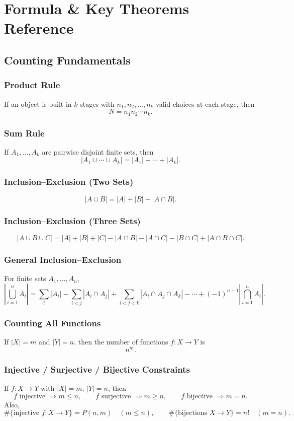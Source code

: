\documentclass[12pt]{article}
\begin{document}
\section{Formula \& Key Theorems Reference}

\subsection{Counting Fundamentals}

\subsubsection{Product Rule}
If an object is built in \(k\) stages with \(n_1,n_2,\dots,n_k\) valid choices at each stage, then
\[
N=n_1n_2\cdots n_k.
\]

\subsubsection{Sum Rule}
If \(A_1,\dots,A_k\) are pairwise disjoint finite sets, then
\[
\left|A_1\cup\cdots\cup A_k\right|
=
|A_1|+\cdots+|A_k|.
\]

\subsubsection{Inclusion--Exclusion (Two Sets)}
\[
|A\cup B|=|A|+|B|-|A\cap B|.
\]

\subsubsection{Inclusion--Exclusion (Three Sets)}
\[
|A\cup B\cup C|
=
|A|+|B|+|C|
-|A\cap B|-|A\cap C|-|B\cap C|
+|A\cap B\cap C|.
\]

\subsubsection{General Inclusion--Exclusion}
For finite sets \(A_1,\dots,A_n\),
\[
\left|\bigcup_{i=1}^n A_i\right|
=
\sum_i |A_i|
-\sum_{i<j}|A_i\cap A_j|
+\sum_{i<j<k}|A_i\cap A_j\cap A_k|
-\cdots
+(-1)^{n+1}\left|\bigcap_{i=1}^n A_i\right|.
\]

\subsubsection{Counting All Functions}
If \(|X|=m\) and \(|Y|=n\), then the number of functions \(f:X\to Y\) is
\[
n^m.
\]

\subsubsection{Injective / Surjective / Bijective Constraints}
If \(f:X\to Y\) with \(|X|=m\), \(|Y|=n\), then
\[
f\text{ injective } \Longrightarrow m\le n,
\qquad
f\text{ surjective } \Longrightarrow m\ge n,
\qquad
f\text{ bijective } \Longrightarrow m=n.
\]
Also,
\[
\#\{\text{injective }f:X\to Y\}=P(n,m)\quad (m\le n),
\qquad
\#\{\text{bijections }X\to Y\}=n!\quad (m=n).
\]
\end{document}
